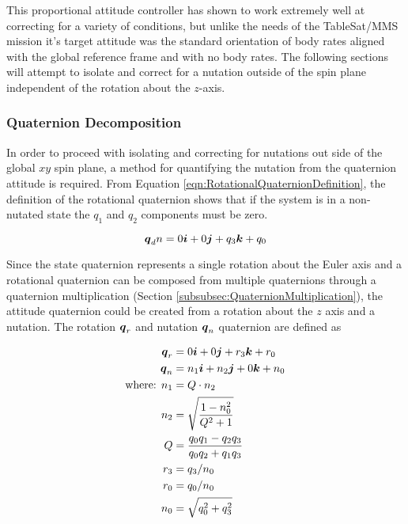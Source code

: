 This proportional attitude controller has shown to work extremely well at correcting for a variety of conditions, but unlike the needs of the TableSat/MMS mission it's target attitude was the standard orientation of body rates aligned with the global reference frame and with no body rates.  The following sections will attempt to isolate and correct for a nutation outside of the spin plane independent of the rotation about the $z$-axis.

\subsubsection{Quaternion Decomposition}
\label{subsec:QuaternionDecomposition}

In order to proceed with isolating and correcting for nutations out side of the global $xy$ spin plane, a method for quantifying the nutation from the quaternion attitude is required.  From Equation \ref{eqn:RotationalQuaternionDefinition}, the definition of the rotational quaternion shows that if the system is in a non-nutated state the $q_1$ and $q_2$ components must be zero.

\begin{equation}
  \boldsymbol{q}_dn = 0 \boldsymbol{i} + 0 \boldsymbol{j} +q_3 \boldsymbol{k} + q_0
  \label{eqn:NutationDesiredQuaternion}
\end{equation}

Since the state quaternion represents a single rotation about the Euler axis and a rotational quaternion can be composed from multiple quaternions through a quaternion multiplication (Section \ref{subsubsec:QuaternionMultiplication}), the attitude quaternion could be created from a rotation about the $z$ axis and a nutation.  The rotation $\boldsymbol{q}_r$ and nutation $\boldsymbol{q}_n$ quaternion are defined as

\begin{subequations}
  \begin{align}
    \boldsymbol{q}_r &= 0 \boldsymbol{i} + 0 \boldsymbol{j} + r_3 \boldsymbol{k} + r_0\\
    \boldsymbol{q}_n &= n_1 \boldsymbol{i} + n_2 \boldsymbol{j} + 0 \boldsymbol{k} + n_0 \\
    \text{where: } n_1 &= Q \cdot n_2 \\
    n_2 &= \sqrt{\frac{1 - n_0^2}{Q^2 + 1}} \\
    Q &= \frac{q_0 q_1 - q_2 q_3}{q_0 q_2 + q_1 q_3} \\
    r_3 &= q_3 / n_0 \\
    r_0 &= q_0 / n_0 \\
    n_0 &= \sqrt{q_0^2 + q_3^2}
  \end{align}
  \label{eqn:DecomposeQuaternion}
\end{subequations}

